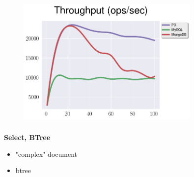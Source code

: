 \documentclass[usenames,dvipsnames, 18pt, compress, aspectratio=169]{beamer}
\begin{document}
\begin{frame}
    \frametitle{}
    \begin{center}
    \vspace{10pt}
    \begin{figure}
        \includegraphics[width=0.8\textwidth,center]{benchmarks/select_btree_throughput.png}
    \end{figure}
    \end{center}
\end{frame}


\begin{frame}
    \frametitle{}
    \begin{center}
        \textbf{Select, BTree}
        \begin{itemize}[label={}]
            \item "complex" document
            \item btree
        \end{itemize}
    \end{center}
\end{frame}
\end{document}
